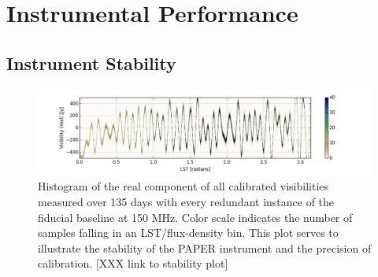 \documentclass[twocolumn,numberedappendix]{emulateapj} \shorttitle{New Limits on the 21 cm Power Spectrum at $z=8.4$}
\begin{document}

\section{Instrumental Performance}\label{sec:instrument}
\subsection{Instrument Stability}

\begin{figure}
\centering
\includegraphics[width=2.3\columnwidth]{plots/density.png}
\caption{Histogram of the real component of all calibrated visibilities
measured over 135 days with every redundant instance of the fiducial baseline at 150
MHz.  Color scale indicates the number of samples falling in an
LST/flux-density bin.  This plot serves to illustrate the stability of the
PAPER instrument and the precision of calibration.
[XXX link to stability plot]
}\label{fig:density}
\end{figure}
\end{document}
